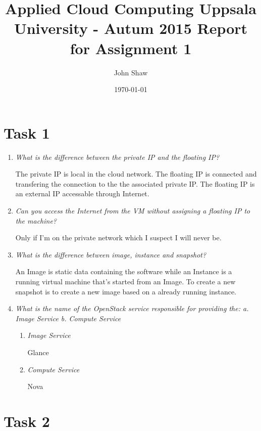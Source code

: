 \documentclass[a4paper]{article}
\title{Applied Cloud Computing
Uppsala University - Autum 2015
Report for Assignment 1}
\author{John Shaw}
\date{\today}
\begin{document}
\maketitle

\section*{Task 1}

\begin{enumerate}
    \item \textit{What is the difference between the private IP and the floating IP?}
    
    The private IP is local in the cloud network. The floating IP is connected and transfering the connection to the the associated private IP. The floating IP is an external IP accessable through Internet.
    \item \textit{Can you access the Internet from the VM without assigning a floating IP to the machine?}
    
    Only if I'm on the private network which I suspect I will never be.
    \item \textit{What is the difference between image, instance and snapshot?}
    
    An Image is static data containing the software while an Instance is a running virtual machine that's started from an Image.
    To create a new snapshot is to create a new image based on a already running instance.
    \item \textit{What is the name of the OpenStack service responsible for providing the: a. Image Service b. Compute Service}
    
        \begin{enumerate}
            \item \textit{Image Service}
            
            Glance
            \item \textit{Compute Service}
            
            Nova
        \end{enumerate}
\end{enumerate}

\section*{Task 2}
\end{document}
